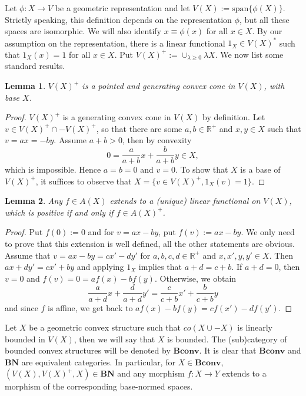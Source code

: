 \documentclass[12pt]{article}
\newtheorem{lemma}{Lemma}
\newcommand{\<}{\langle}
\newcommand{\ct}[1]{\mathbf{#1}}
\begin{document}
Let $\phi:X\to V$ be a geometric representation and let $V(X):=\mathrm{span}\{\phi(X)\}$. Strictly speaking, this definition depends on the representation $\phi$, but all
 these  spaces  are isomorphic. We will also identify $x\equiv \phi(x)$ for all $x\in X$. By our assumption on the representation, there is a linear functional $1_X\in V(X)^*$ such that 
 $1_X(x)=1$ for all $x\in X$. Put $V(X)^+:=\cup_{\lambda\ge 0} \lambda X$. We now list some standard results.

\begin{lemma} %
$V(X)^+$ is a pointed and generating convex cone in $V(X)$, with base $X$.

\end{lemma}

\begin{proof} $V(X)^+$ is a generating convex cone in $V(X)$ by definition. Let $v\in V(X)^+\cap -V(X)^+$, so that there are some $a,b\in \mathbb R^+$ and $x,y\in X$ such that $v=ax=-by$. Assume $a+b>0$, then by convexity 
\[
0=\frac a{a+b}x+\frac b{a+b}y\in X,
\]
 which is impossible. Hence $a=b=0$ and $v=0$. To show that $X$ is a base of $V(X)^+$, it suffices to observe that $X=\{v\in V(X)^+, 1_X(v)=1\}$.


\end{proof}



\begin{lemma}\label{lemma:extension} Any $f\in A(X)$ extends to a (unique) linear functional on $V(X)$, which is positive if and only if $f\in A(X)^+$.

\end{lemma}

\begin{proof} Put $f(0):=0$ and for $v=ax-by$, put $f(v):=ax-by$. We only need to prove that this extension is well defined, all the other  statements are obvious. Assume that $v=ax-by=cx'-dy'$ for $a,b,c,d\in \mathbb R^+$ and $x,x',y,y'\in X$. Then $ax+dy'=cx'+by$ and applying $1_X$ implies that $a+d=c+b$.
 If $a+d=0$, then $v=0$ and $f(v)=0=af(x)-bf(y)$. Otherwise, we obtain 
 \[
\frac a{a+d}x+ \frac d{a+d}y'=\frac c{c+b} x'+\frac b{c+b} y
 \]
and since $f$ is affine, we get back to $af(x)-bf(y)=cf(x')-df(y')$. 
\end{proof}






Let $X$ be a geometric convex structure such that $co(X\cup -X)$ is linearly bounded in $V(X)$, then we will say that $X$ is bounded.
 The (sub)category of  bounded convex structures will be denoted by $\ct{Bconv}$. It is clear that $\ct{Bconv}$ and $\ct{BN}$ are equivalent categories. In particular,
for $X\in \ct{Bconv}$, $(V(X),V(X)^+,X)\in \ct{BN}$ and any morphism $f:X\to Y$ extends to a morphism of the corresponding base-normed spaces. 
\end{document}
